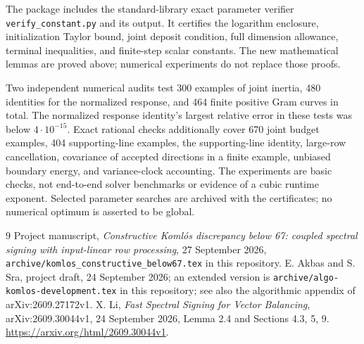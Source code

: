 \documentclass[11pt]{amsart}
\theoremstyle{remark}\newtheorem{remark}[theorem]{Remark}
\begin{document}
The package includes the standard-library exact parameter verifier
\texttt{verify\_constant.py} and its output. It certifies the logarithm
enclosure, initialization Taylor bound, joint deposit condition, full
dimension allowance, terminal inequalities, and finite-step scalar
constants. The new mathematical lemmas are proved above; numerical
experiments do not replace those proofs.

Two independent numerical audits test 300 examples of joint inertia,
480 identities for the normalized response, and 464 finite positive Gram
curves in total. The normalized response identity's largest relative error
in these tests was below $4\cdot10^{-15}$.
Exact rational checks additionally cover 670 joint budget examples,
404 supporting-line examples, the supporting-line identity,
large-row cancellation, covariance of accepted directions in a finite
example, unbiased boundary energy, and variance-clock accounting. The experiments
are basic checks, not end-to-end solver benchmarks or evidence of a cubic
runtime exponent. Selected parameter searches are archived with the certificates;
no numerical optimum is asserted to be global.

\begin{thebibliography}{9}
 Project manuscript,
\emph{Constructive Koml\'os discrepancy below 67: coupled spectral signing
with input-linear row processing}, 27 September 2026,
\nolinkurl{archive/komlos_constructive_below67.tex} in this repository.
 E. Akbas and S. Sra, project draft, 24 September 2026;
an extended version is \nolinkurl{archive/algo-komlos-development.tex} in
this repository; see also the algorithmic appendix of arXiv:2609.27172v1.
 X. Li, \emph{Fast Spectral Signing for Vector Balancing},
arXiv:2609.30044v1, 24 September 2026, Lemma 2.4 and Sections 4.3, 5, 9.
\url{https://arxiv.org/html/2609.30044v1}.
\end{thebibliography}
\end{document}
